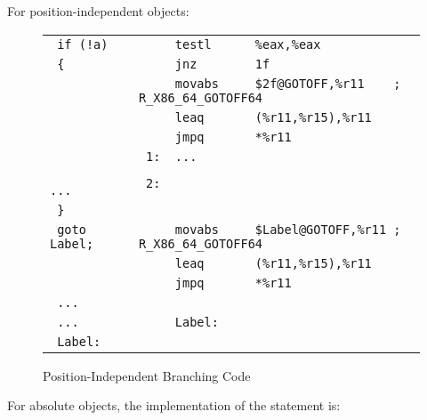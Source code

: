 For position-independent objects:

\begin{figure}[H]
\Hrule
\caption{Position-Independent Branching Code}\label{large_pic_branching}
\begin{footnotesize}
\begin{tabular}{|l|l|}
\hline
\verb# if (!a)      # & \verb#     testl      %eax,%eax          # \\
\verb# {            # & \verb#     jnz        1f                 # \\
\verb#              # & \verb#     movabs     $2f@GOTOFF,%r11    ; R_X86_64_GOTOFF64 # \\
\verb#              # & \verb#     leaq       (%r11,%r15),%r11   # \\
\verb#              # & \verb#     jmpq       *%r11              # \\
\verb#              # & \verb# 1:  ...                           # \\
\verb#         ...  # & \verb# 2:                                # \\
\verb# }            # & \verb#                                   # \\
\hline
\verb# goto Label;  # & \verb#     movabs     $Label@GOTOFF,%r11 ; R_X86_64_GOTOFF64 # \\
\verb#              # & \verb#     leaq       (%r11,%r15),%r11   # \\
\verb#              # & \verb#     jmpq       *%r11              # \\
\verb# ...          # & \verb#                                   # \\
\verb# ...          # & \verb#     Label:                        # \\
\verb# Label:       # & \verb#                                   # \\
\hline
\end{tabular}
\end{footnotesize}
\end{figure}

For absolute objects, the implementation of the  statement is:

